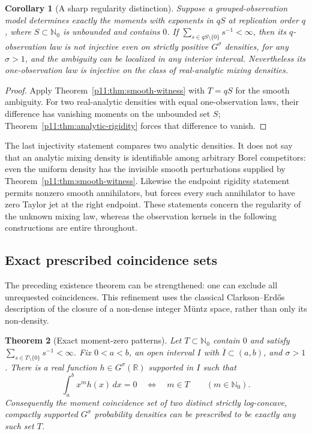 \documentclass[11pt,letterpaper]{article}
\newtheorem{theorem}{Theorem}[section]
\newtheorem{corollary}[theorem]{Corollary}
\theoremstyle{definition}
\theoremstyle{remark}
\newcommand{\1}{\mathbf 1}
\begin{document}
\begin{corollary}[A sharp regularity distinction]\label{p11:cor:regularity-threshold}
Suppose a grouped-observation model determines exactly the moments with
exponents in $qS$ at replication order $q$, where $S\subset\mathbb N_0$
is unbounded and contains $0$. If $\sum_{s\in qS\setminus\{0\}}s^{-1}<\infty$, then its $q$-observation law is not
injective even on strictly positive $G^\sigma$ densities, for any
$\sigma>1$, and the ambiguity can be localized in any interior interval.
Nevertheless its one-observation law is injective on the class of
real-analytic mixing densities.
\end{corollary}
\begin{proof}
Apply Theorem~\ref{p11:thm:smooth-witness} with $T=qS$ for the smooth
ambiguity. For two real-analytic densities with equal one-observation
laws, their difference has vanishing moments on the unbounded set $S$;
Theorem~\ref{p11:thm:analytic-rigidity} forces that difference to vanish.
\end{proof}

The last injectivity statement compares two analytic densities. It does
not say that an analytic mixing density is identifiable among arbitrary
Borel competitors: even the uniform density has the invisible smooth
perturbations supplied by Theorem~\ref{p11:thm:smooth-witness}. Likewise the
endpoint rigidity statement permits nonzero smooth annihilators, but
forces every such annihilator to have zero Taylor jet at the right
endpoint. These statements concern the regularity of the unknown mixing
law, whereas the observation kernels in the following constructions are
entire throughout.


\subsection{Exact prescribed coincidence sets}
\label{p11:sec:exact-moment-pattern}

The preceding existence theorem can be strengthened: one can exclude all
unrequested coincidences. This refinement uses the classical
Clarkson--Erd\H{o}s description of the closure of a non-dense integer
M\"untz space, rather than only its non-density.

\begin{theorem}[Exact moment-zero patterns]\label{p11:thm:exact-moment-pattern}
Let $T\subset\mathbb N_0$ contain $0$ and satisfy
$\sum_{s\in T\setminus\{0\}}s^{-1}<\infty$. Fix $0<a<b$, an open
interval $I$ with $\overline I\subset(a,b)$, and $\sigma>1$.
There is a real function $h\in G^\sigma(\mathbb R)$ supported in $I$
such that
\[
 \int_a^b x^m h(x)\,dx=0\quad\Longleftrightarrow\quad m\in T
       \qquad(m\in\mathbb N_0).
\]
Consequently the moment coincidence set of two distinct strictly
log-concave, compactly supported $G^\sigma$ probability densities can
be prescribed to be exactly any such set $T$.
\end{theorem}
\end{document}
